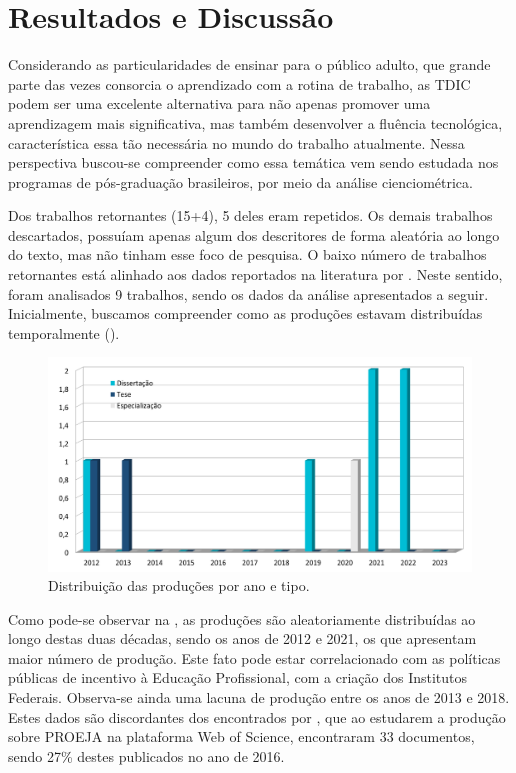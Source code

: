 \section{Resultados e Discussão}\label{sec-resultados}

Considerando as particularidades de ensinar para o público adulto, que
grande parte das vezes consorcia o aprendizado com a rotina de trabalho,
as TDIC podem ser uma excelente alternativa para não apenas promover uma
aprendizagem mais significativa, mas também desenvolver a fluência
tecnológica, característica essa tão necessária no mundo do trabalho
atualmente. Nessa perspectiva buscou-se compreender como essa temática
vem sendo estudada nos programas de pós-graduação brasileiros, por meio
da análise cienciométrica.

Dos trabalhos retornantes (15+4), 5 deles eram repetidos. Os demais
trabalhos descartados, possuíam apenas algum dos descritores de forma
aleatória ao longo do texto, mas não tinham esse foco de pesquisa. O
baixo número de trabalhos retornantes está alinhado aos dados reportados
na literatura por \textcite{BrancoPinto2022}. Neste sentido, foram analisados
9 trabalhos, sendo os dados da análise apresentados a seguir.
Inicialmente, buscamos compreender como as produções estavam
distribuídas temporalmente ().

\begin{figure}[!htpb]
\centering
\begin{minipage}{.5\textwidth}
\caption{Distribuição das produções por ano e tipo.}\label{fig2}
\includegraphics[width=\textwidth]{Fig2.png}
\end{minipage}
\end{figure}


Como pode-se observar na , as produções são aleatoriamente
distribuídas ao longo destas duas décadas, sendo os anos de 2012 e 2021,
os que apresentam maior número de produção. Este fato pode estar
correlacionado com as políticas públicas de incentivo à Educação
Profissional, com a criação dos Institutos Federais. Observa-se ainda
uma lacuna de produção entre os anos de 2013 e 2018. Estes dados são
discordantes dos encontrados por \textcite{vieira2021}, que ao
estudarem a produção sobre PROEJA na plataforma Web of Science,
encontraram 33 documentos, sendo 27\% destes publicados no ano de 2016.

